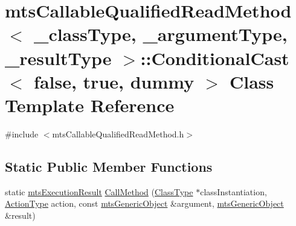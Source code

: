 \hypertarget{classmts_callable_qualified_read_method_1_1_conditional_cast_3_01false_00_01true_00_01dummy_01_4}{\section{mts\-Callable\-Qualified\-Read\-Method$<$ \-\_\-class\-Type, \-\_\-argument\-Type, \-\_\-result\-Type $>$\-:\-:Conditional\-Cast$<$ false, true, dummy $>$ Class Template Reference}
\label{classmts_callable_qualified_read_method_1_1_conditional_cast_3_01false_00_01true_00_01dummy_01_4}
}


{\ttfamily \#include $<$mts\-Callable\-Qualified\-Read\-Method.\-h$>$}

\subsection*{Static Public Member Functions}
\begin{DoxyCompactItemize}
\item 
static \hyperlink{classmts_execution_result}{mts\-Execution\-Result} \hyperlink{classmts_callable_qualified_read_method_1_1_conditional_cast_3_01false_00_01true_00_01dummy_01_4_ae07239189a99998b02b7959194128ebe}{Call\-Method} (\hyperlink{classmts_callable_qualified_read_method_a6cfee5c3c3c49c691c2f5176ea79d735}{Class\-Type} $\ast$class\-Instantiation, \hyperlink{classmts_callable_qualified_read_method_ac6fc895837df0b66d84405f3ee01f153}{Action\-Type} action, const \hyperlink{classmts_generic_object}{mts\-Generic\-Object} \&argument, \hyperlink{classmts_generic_object}{mts\-Generic\-Object} \&result)
\end{DoxyCompactItemize}



